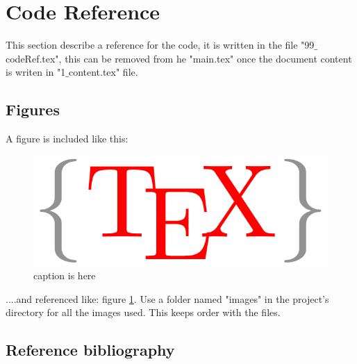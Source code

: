 \section{Code Reference}
This section describe a reference for the code, it is written in the file "99$\_$codeRef.tex", this can be removed from he "main.tex" once the document content is writen in "1$\_$content.tex" file.

\subsection{Figures}
A figure is included like this:

\begin{figure}[H]
\begin{center}
 \includegraphics[scale=0.5]{images/latex}
\caption{caption is here}
\label{fig: latex}
\end{center}
\end{figure}


....and referenced like: figure \ref{fig: latex}. Use a folder named "images" in the project's directory for all the images used. This keeps order with the files.\\



\subsection{Reference bibliography}

